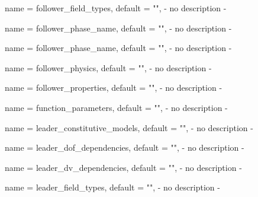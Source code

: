 \begin{parameter}{
    name    = {follower_field_types},
    default = {""},
}
- no description -
\end{parameter}

\begin{parameter}{
    name    = {follower_phase_name},
    default = {""},
}
- no description -
\end{parameter}

\begin{parameter}{
    name    = {follower_phase_name},
    default = {""},
}
- no description -
\end{parameter}

\begin{parameter}{
    name    = {follower_physics},
    default = {""},
}
- no description -
\end{parameter}

\begin{parameter}{
    name    = {follower_properties},
    default = {""},
}
- no description -
\end{parameter}

\begin{parameter}{
    name    = {function_parameters},
    default = {""},
}
- no description -
\end{parameter}

\begin{parameter}{
    name    = {leader_constitutive_models},
    default = {""},
}
- no description -
\end{parameter}

\begin{parameter}{
    name    = {leader_dof_dependencies},
    default = {""},
}
- no description -
\end{parameter}

\begin{parameter}{
    name    = {leader_dv_dependencies},
    default = {""},
}
- no description -
\end{parameter}

\begin{parameter}{
    name    = {leader_field_types},
    default = {""},
}
- no description -
\end{parameter}

